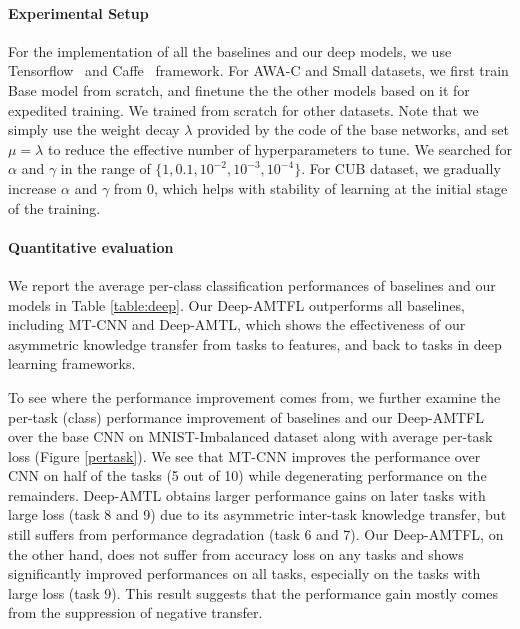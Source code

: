 \documentclass{article}
\begin{document}
	\paragraph{Experimental Setup}
	For the implementation of all the baselines and our deep models, we use Tensorflow~\cite{tensorflow} and Caffe~\cite{caffe} framework. For AWA-C and Small datasets, we first train Base model from scratch, and finetune the the other models based on it for expedited training. We trained from scratch for other datasets. Note that we simply use the weight decay $\lambda$ provided by the code of the base networks, and set $\mu=\lambda$ to reduce the effective number of hyperparameters to tune. We searched for $\alpha$ and $\gamma$ in the range of $\{1, 0.1, 10^{-2}, 10^{-3},10^{-4}\}$. For CUB dataset, we gradually increase $\alpha$ and $\gamma$ from $0$, which helps with stability of learning at the initial stage of the training.
	
	\paragraph{Quantitative evaluation}
	We report the average per-class classification performances of baselines and our models in Table \ref{table:deep}. Our Deep-AMTFL outperforms all baselines, including MT-CNN and Deep-AMTL, which shows the effectiveness of our asymmetric knowledge transfer from tasks to features, and back to tasks in deep learning frameworks.
	
	To see where the performance improvement comes from, we further examine the per-task (class) performance improvement of baselines and our Deep-AMTFL over the base CNN on MNIST-Imbalanced dataset along with average per-task loss (Figure \ref{pertask}). We see that MT-CNN improves the performance over CNN on half of the tasks (5 out of 10) while degenerating performance on the remainders. Deep-AMTL obtains larger performance gains on later tasks with large loss (task 8 and 9) due to its asymmetric inter-task knowledge transfer, but still suffers from performance degradation (task 6 and 7). Our Deep-AMTFL, on the other hand, does not suffer from accuracy loss on any tasks and shows significantly improved performances on all tasks, especially on the tasks with large loss (task 9). This result suggests that the performance gain mostly comes from the suppression of negative transfer. %
	
\end{document}
